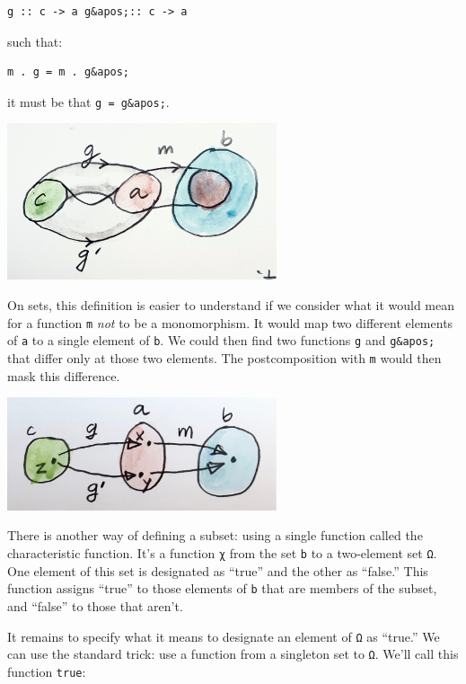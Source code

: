 \begin{verbatim}
g :: c -> a g&apos;:: c -> a
\end{verbatim}

such that:

\begin{verbatim}
m . g = m . g&apos;
\end{verbatim}

it must be that \texttt{g\ =\ g\&apos;}.

\includegraphics[width=3.12500in]{images/monomorphism.jpg}

On sets, this definition is easier to understand if we consider what it
would mean for a function \texttt{m} \emph{not} to be a monomorphism. It
would map two different elements of \texttt{a} to a single element of
\texttt{b}. We could then find two functions \texttt{g} and
\texttt{g\&apos;} that differ only at those two elements. The
postcomposition with \texttt{m} would then mask this difference.

\includegraphics[width=3.12500in]{images/notmono.jpg}

There is another way of defining a subset: using a single function
called the characteristic function. It's a function \texttt{χ} from the
set \texttt{b} to a two-element set \texttt{Ω}. One element of this set
is designated as ``true'' and the other as ``false.'' This function
assigns ``true'' to those elements of \texttt{b} that are members of the
subset, and ``false'' to those that aren't.

It remains to specify what it means to designate an element of
\texttt{Ω} as ``true.'' We can use the standard trick: use a function
from a singleton set to \texttt{Ω}. We'll call this function
\texttt{true}:

